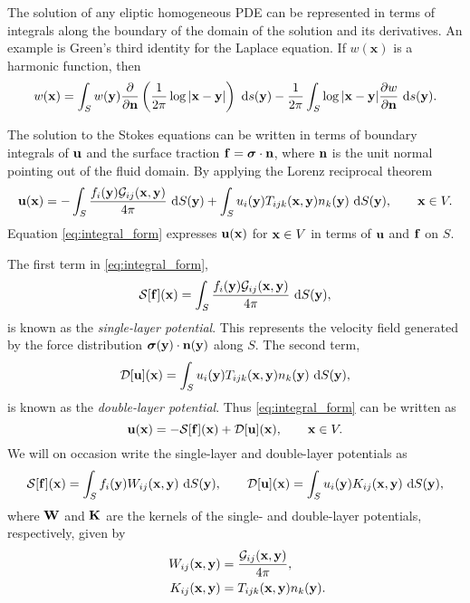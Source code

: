 The solution of any eliptic homogeneous PDE can be represented in terms of integrals along the boundary of the domain of the solution and its derivatives. An example is Green's third identity for the Laplace equation. If $w(\mathbf{x})$ is a harmonic function, then 
\[ w(\mathbf{x}) = \int_S w({\mathbf{y}})\frac{\partial}{\partial{\mathbf{n}}}\left(\frac{1}{2\pi} \log | {\mathbf{x}} -{\mathbf{y}} |\right)~\text{d}s({\mathbf{y}}) - \frac{1}{2\pi}\int_S\log |{\mathbf{x}} - {\mathbf{y}}| \frac{\partial w}{\partial{\mathbf{n}}}~\text{d}s({\mathbf{y}}).\]

 The solution to the Stokes equations can be written in terms of boundary integrals of ${\mathbf{u}}$ and the surface traction ${\mathbf{f}} = {\boldsymbol\sigma}\cdot{\mathbf{n}}$, where ${\mathbf{n}}$ is the unit normal pointing out of the fluid domain. By applying the Lorenz reciprocal theorem \cite{Karrila1991, Ladyzhenskaya1963,Pozrikidis1992}
\begin{equation}\label{eq:integral_form}{\mathbf{u}}({\mathbf{x}}) = -\int_S  \frac{f_i({\mathbf{y}})\mathcal{G}_{ij}({\mathbf{x}} , {\mathbf{y}})}{4\pi}~\text{d}S({\mathbf{y}}) + \int_S u_i({\mathbf{y}}) T_{ijk}({\mathbf{x}} , {\mathbf{y}})n_k({\mathbf{y}})~\text{d}S({\mathbf{y}}),\qquad {\mathbf{x}}\in V.\end{equation}
Equation \eqref{eq:integral_form} expresses ${\mathbf{u}}({\mathbf{x}})$ for ${\mathbf{x}}\in V$ in terms of ${\mathbf{u}}$ and ${\mathbf{f}}$ on $S$. 

The first term in \eqref{eq:integral_form},
\begin{equation}\label{eq:slp_primative}
	\mathcal{S}[{\mathbf{f}}]({\mathbf{x}}) = \int_S  \frac{f_i({\mathbf{y}})\mathcal{G}_{ij}({\mathbf{x}} , {\mathbf{y}})}{4\pi}~\text{d}S({\mathbf{y}}) ,
\end{equation}
is known as the \emph{single-layer potential}. This represents the velocity field generated by the force distribution ${\boldsymbol\sigma}({\mathbf{y}})\cdot{\mathbf{n}}({\mathbf{y}})$ along $S$. The second term,
\begin{equation}\label{eq:dlp_primative}
 \mathcal{D}[{\mathbf{u}}]({\mathbf{x}}) = \int_S u_i({\mathbf{y}}) T_{ijk}({\mathbf{x}} , {\mathbf{y}})n_k({\mathbf{y}})~\text{d}S({\mathbf{y}}),
\end{equation}
is known as the \emph{double-layer potential}. Thus \eqref{eq:integral_form} can be written as
\[ {\mathbf{u}}({\mathbf{x}}) = -\mathcal{S}[{\mathbf{f}}]({\mathbf{x}}) + \mathcal{D}[{\mathbf{u}}]({\mathbf{x}}) ,\qquad {\mathbf{x}}\in V.\]
We will on occasion write the single-layer and double-layer potentials as
\[ \mathcal{S}[{\mathbf{f}}]({\mathbf{x}}) = \int_S f_i({\mathbf{y}}) W_{ij}({\mathbf{x}},{\mathbf{y}})~\text{d}S({\mathbf{y}}), \qquad \mathcal{D}[{\mathbf{u}}]({\mathbf{x}}) = \int_S u_i({\mathbf{y}})K_{ij}({\mathbf{x}},{\mathbf{y}})~\text{d}S({\mathbf{y}}),\]
where ${\mathbf{W}}$ and ${\mathbf{K}}$ are the kernels of the single- and double-layer potentials, respectively, given by
\begin{subequations}
	\begin{align}
		 W_{ij}({\mathbf{x}},{\mathbf{y}}) &= \frac{\mathcal{G}_{ij}({\mathbf{x}},{\mathbf{y}})}{4\pi},\\ \qquad K_{ij}({\mathbf{x}},{\mathbf{y}}) &=T_{ijk}({\mathbf{x}},{\mathbf{y}})n_k({\mathbf{y}}).\label{eq:dlp_kernel}
	\end{align}
\end{subequations}

